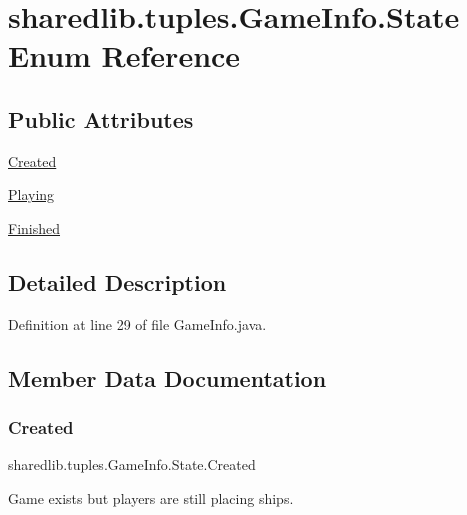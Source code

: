 \hypertarget{enumsharedlib_1_1tuples_1_1_game_info_1_1_state}{}\section{sharedlib.\+tuples.\+Game\+Info.\+State Enum Reference}
\label{enumsharedlib_1_1tuples_1_1_game_info_1_1_state}
\subsection*{Public Attributes}
\begin{DoxyCompactItemize}
\item 
\hyperlink{enumsharedlib_1_1tuples_1_1_game_info_1_1_state_ae938cb1011e43a20daa6f578bebc2c8d}{Created}
\item 
\hyperlink{enumsharedlib_1_1tuples_1_1_game_info_1_1_state_a2e21975e1bb9d5e7dd0c567be4fa8200}{Playing}
\item 
\hyperlink{enumsharedlib_1_1tuples_1_1_game_info_1_1_state_af3bc3f542e250bbbb69103954d606f10}{Finished}
\end{DoxyCompactItemize}


\subsection{Detailed Description}


Definition at line 29 of file Game\+Info.\+java.



\subsection{Member Data Documentation}
\hypertarget{enumsharedlib_1_1tuples_1_1_game_info_1_1_state_ae938cb1011e43a20daa6f578bebc2c8d}{}\label{enumsharedlib_1_1tuples_1_1_game_info_1_1_state_ae938cb1011e43a20daa6f578bebc2c8d} 
\subsubsection{\texorpdfstring{Created}{Created}}
{\footnotesize\ttfamily sharedlib.\+tuples.\+Game\+Info.\+State.\+Created}

Game exists but players are still placing ships. 

